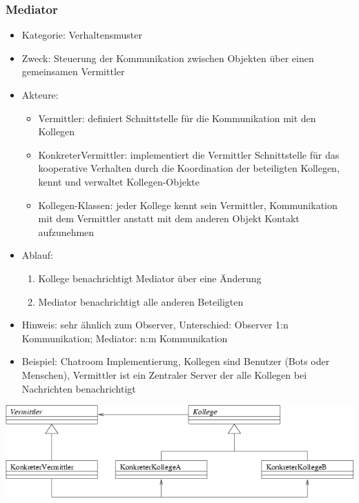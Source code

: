 \documentclass[11pt, fleqn, a4paper, leqno]{scrartcl} %
\begin{document}
		\subsubsection{Mediator}
			\begin{itemize}
				\item Kategorie: Verhaltensmuster
				\item Zweck: Steuerung der Kommunikation zwischen Objekten über einen gemeinsamen Vermittler
				\item Akteure: 
					\begin{itemize}
						\item Vermittler: definiert Schnittstelle für die Kommunikation mit den Kollegen
						\item KonkreterVermittler: implementiert die Vermittler Schnittstelle für das kooperative Verhalten durch die Koordination der beteiligten Kollegen, kennt und verwaltet Kollegen-Objekte
						\item Kollegen-Klassen: jeder Kollege kennt sein Vermittler, Kommunikation mit dem Vermittler anstatt mit dem anderen Objekt Kontakt aufzunehmen
					\end{itemize}
				\item Ablauf:
					\begin{enumerate}
						\item Kollege benachrichtigt Mediator über eine Änderung
						\item Mediator benachrichtigt alle anderen Beteiligten
					\end{enumerate}
				\item Hinweis: sehr ähnlich zum Observer, Unterschied: Observer 1:n Kommunikation; Mediator: n:m Kommunikation
				\item Beispiel: Chatroom Implementierung, Kollegen sind Benutzer (Bots oder Menschen), Vermittler ist ein Zentraler Server der alle Kollegen bei Nachrichten benachrichtigt			
			\end{itemize}
			\includegraphics{images/mediator.png}
			\newpage
\end{document}
